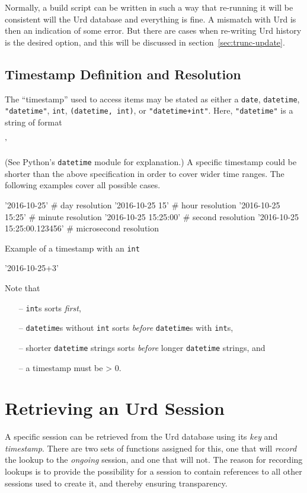 Normally, a build script can be written in such a way that re-running
it will be consistent will the Urd database and everything is fine.  A
mismatch with Urd is then an indication of some error.  But there are
cases when re-writing Urd history is the desired option, and this will
be discussed in section~\ref{sec:trunc-update}.





\subsection{Timestamp Definition and Resolution}
The ``timestamp'' used to access items may be stated as either
a \texttt{date}, \texttt{datetime}, \texttt{"datetime"}, \texttt{int}, \texttt{(datetime,
int)}, or \texttt{"datetime+int"}.  Here, \texttt{"datetime"} is a
string of format
\begin{shell}
'%
\end{shell}
(See Python's \texttt{datetime} module for explanation.)  A specific
timestamp could be shorter than the above specification in order to
cover wider time ranges.  The following examples cover all possible
cases.
\begin{python}
'2016-10-25'                 # day resolution
'2016-10-25 15'              # hour resolution
'2016-10-25 15:25'           # minute resolution
'2016-10-25 15:25:00'        # second resolution
'2016-10-25 15:25:00.123456' # microsecond resolution
\end{python}
Example of a timestamp with an \texttt{int}
\begin{python}
'2016-10-25+3'
\end{python}
Note that
\begin{itemize}
  \item[--] \texttt{int}s sorts \textsl{first}, 
  \item[--] \texttt{datetime}s without \texttt{int} sorts \textsl{before} \texttt{datetime}s with \texttt{int}s, 
  \item[--] shorter \texttt{datetime} strings sorts \textsl{before} longer \texttt{datetime} strings, and
  \item[--] a timestamp must be > 0.
\end{itemize}





\section{Retrieving an Urd Session}
A specific session can be retrieved from the Urd database using its
\textsl{key} and \textsl{timestamp}.  There are two sets of functions
assigned for this, one that will \textsl{record} the lookup to
the \textsl{ongoing} session, and one that will not.  The reason for
recording lookups is to provide the possibility for a session to
contain references to all other sessions used to create it, and
thereby ensuring transparency.

